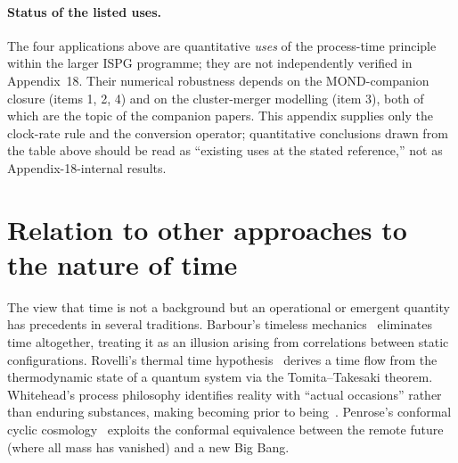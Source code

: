 \documentclass[11pt]{article}
\begin{document}
\paragraph{Status of the listed uses.}
The four applications above are quantitative \emph{uses} of the
process-time principle within the larger ISPG programme; they are
not independently verified in Appendix~18.  Their numerical
robustness depends on the MOND-companion closure (items 1, 2, 4) and
on the cluster-merger modelling (item 3), both of which are the
topic of the companion papers.  This appendix supplies only the
clock-rate rule and the conversion operator; quantitative
conclusions drawn from the table above should be read as
``existing uses at the stated reference,'' not as
Appendix-18-internal results.

\section{Relation to other approaches to the nature of time}
\label{sec:comparison_app18}

The view that time is not a background but an operational or
emergent quantity has precedents in several traditions.
Barbour's timeless mechanics~\cite{Barbour1999} eliminates time
altogether, treating it as an illusion arising from correlations
between static configurations.
Rovelli's thermal time hypothesis~\cite{ConnesRovelli1994}
derives a time flow from the thermodynamic state of a quantum
system via the Tomita--Takesaki theorem.
Whitehead's process philosophy identifies reality with
``actual occasions'' rather than enduring substances, making
becoming prior to being~\cite{Whitehead1929}.
Penrose's conformal cyclic cosmology~\cite{Penrose2010} exploits
the conformal equivalence between the remote future (where all
mass has vanished) and a new Big Bang.
\end{document}
